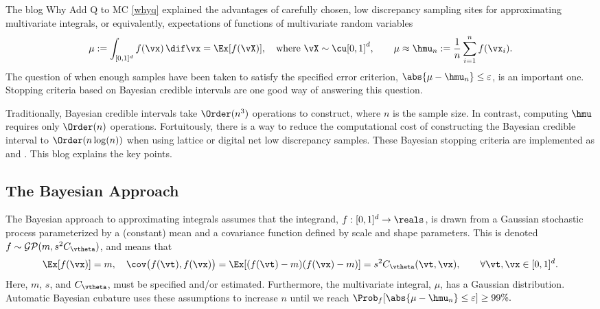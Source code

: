 The blog Why Add Q to MC \ref{whyq} explained the advantages of carefully chosen, low discrepancy sampling sites for approximating multivariate integrals, or equivalently, expectations of functions of multivariate random variables
\[
\mu:  = \int_{[0,1]^d} f(\vx) \, \dif \vx = \Ex[f(\vX)], \quad \text{where } \vX \sim \cu[0,1]^d, \qquad \mu \approx \hmu_n : = \frac 1n \sum_{i=1}^n f(\vx_i).
\]
The question of when enough samples have been taken to satisfy the specified error criterion, $\abs{\mu - \hmu_n} \le \varepsilon$, is an important one.  Stopping criteria based on Bayesian credible intervals are one good way of answering this question.

Traditionally, Bayesian credible intervals take $\Order(n^3)$ operations to construct, where $n$ is the sample size.  In contrast, computing $\hmu$ requires only $\Order(n)$ operations.  Fortuitously, there is a way to reduce the computational cost of constructing the Bayesian credible interval to $\Order(n \log (n))$ when using lattice or digital net low discrepancy samples. These Bayesian stopping criteria are implemented as  and . This blog explains the key points.

\subsection*{The Bayesian Approach}
The Bayesian approach to approximating integrals assumes that the integrand, $f:[0,1]^d \to \reals$, is drawn from a Gaussian stochastic process parameterized by a (constant) mean and a covariance function defined by scale and shape parameters.  This is denoted $f \sim \mathcal{GP}(m,s^2 C_{\vtheta})$, and means that 
\[
\Ex[f(\vx)] = m, \quad \cov\bigl(f(\vt),f(\vx) \bigr) = \Ex[(f(\vt) - m)(f(\vx) - m)] = s^2 C_{\vtheta}(\vt,\vx), \qquad \forall \vt, \vx \in [0,1]^d.
\]
Here, $m$, $s$, and $C_\vtheta$, must be specified and/or estimated.  Furthermore, the multivariate integral, $\mu$, has a Gaussian distribution.  Automatic Bayesian cubature uses these assumptions to increase $n$ until we reach
$
\Prob_f  [\abs{ \mu - \hmu_n} \le \varepsilon ] \ge 99\%.
$

